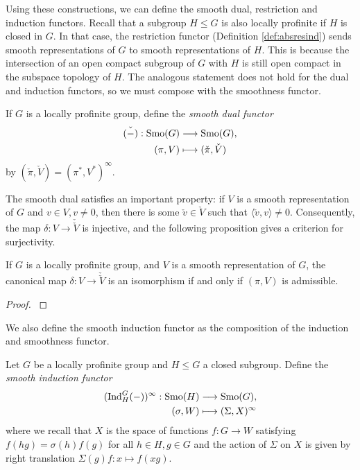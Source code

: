 Using these constructions, we can define the smooth dual, restriction and induction functors. Recall that a subgroup $H\leq G$ is also locally profinite if $H$ is closed in $G$. In that case, the restriction functor (Definition \ref{def:absresind}) sends smooth representations of $G$ to smooth representations of $H$. This is because the intersection of an open compact subgroup of $G$ with $H$ is still open compact in the subspace topology of $H$. The analogous statement does not hold for the dual and induction functors, so we must compose with the smoothness functor.

\begin{defn}
    If $G$ is a locally profinite group, define the \textit{smooth dual functor} 
    \begin{align*}
        \check{(-)}:\mathrm{Smo}(G)&\longrightarrow\mathrm{Smo}(G),\\
        (\pi,V)&\longmapsto(\check{\pi},\check{V})
    \end{align*}
    by $(\check{\pi},\check{V})=(\pi^*,V^*)^\infty$.
\end{defn}

The smooth dual satisfies an important property: if $V$ is a smooth representation of $G$ and $v\in V, v\neq 0$, then there is some $\check{v}\in\check{V}$ such that $\langle\check{v},v\rangle\neq 0$. Consequently, the map $\delta:V\rightarrow\check{\check{V}}$ is injective, and the following proposition gives a criterion for surjectivity.

\begin{prop}
    If $G$ is a locally profinite group, and $V$ is a smooth representation of $G$, the canonical map $\delta:V\longrightarrow\check{\check{V}}$ is an isomorphism if and only if $(\pi,V)$ is admissible.
\end{prop}
\begin{proof}
    \cite[Proposition 2.9]{BH1}
\end{proof}

We also define the smooth induction functor as the composition of the induction and smoothness functor.

\begin{defn}\label{induction}
    Let $G$ be a locally profinite group and $H\leq G$ a closed subgroup. Define the \textit{smooth induction functor}
    \begin{align*}
        (\mathrm{Ind}_H^G(-))^\infty:\mathrm{Smo}(H)&\longrightarrow\mathrm{Smo}(G),\\
        (\sigma,W)&\longmapsto(\Sigma,X)^\infty
    \end{align*}
    where we recall that $X$ is the space of functions $f: G\to W$ satisfying $f(hg) = \sigma(h)f(g)$ for all $h\in H, g\in G$ and the action of $\Sigma$ on $X$ is given by right translation $\Sigma(g)f:x\mapsto f(xg)$.
\end{defn}

